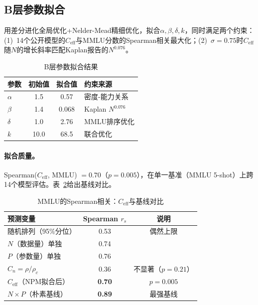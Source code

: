 \documentclass[11pt,a4paper]{article}
\newcommand{\Ceff}{C_{\text{eff}}}
\newcommand{\rhoc}{\rho_c}
\begin{document}
\subsection{B层参数拟合}
\label{sec:param-fit}

用差分进化全局优化+Nelder-Mead精细优化，拟合$\alpha,\beta,\delta,k$，同时满足两个约束：(1)~14个公开模型的$\Ceff$与MMLU分数的Spearman相关最大化；(2)~$\sigma=0.75$时$\Ceff$随$N$的增长斜率匹配Kaplan报告的$N^{0.076}$。

\begin{table}[H]
\centering
\caption{B层参数拟合结果}
\label{tab:param-fit}
\small
\begin{tabular}{lccl}
\toprule
\textbf{参数} & \textbf{初始值} & \textbf{拟合值} & \textbf{约束来源} \\
\midrule
$\alpha$ & 1.5   & 0.57  & 密度-能力关系 \\
$\beta$  & 1.4   & 0.068 & Kaplan $N^{0.076}$ \\
$\delta$ & 1.0   & 2.76  & MMLU排序优化 \\
$k$      & 10.0  & 68.5  & 联合优化 \\
\bottomrule
\end{tabular}
\end{table}

\paragraph{拟合质量。}
Spearman($\Ceff$, MMLU) $= 0.70$（$p=0.005$），在单一基准（MMLU 5-shot）上跨14个模型评估。表~\ref{tab:spearman-baselines}给出基线对比。

\begin{table}[H]
\centering
\caption{MMLU的Spearman相关：$\Ceff$与基线对比}
\label{tab:spearman-baselines}
\small
\begin{tabular}{lcc}
\toprule
\textbf{预测变量} & \textbf{Spearman $r_s$} & \textbf{说明} \\
\midrule
随机排列（95\%分位） & 0.53 & 偶然上限 \\
$N$（数据量）单独 & 0.74 & \\
$P$（参数量）单独 & 0.76 & \\
$C_n = \rho/\rhoc$ & 0.36 & 不显著（$p=0.21$）\\
$\Ceff$（NPM拟合后） & \textbf{0.70} & $p=0.005$ \\
$N \times P$（朴素基线） & \textbf{0.89} & 最强基线 \\
\bottomrule
\end{tabular}
\end{table}
\end{document}
